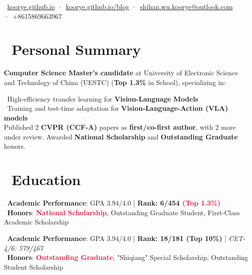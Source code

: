 \documentclass{resume}
\begin{document}

\vspace{-4pt}

\vspace{-4pt}

\vspace{-4pt}
\centerline{\sffamily\large{
\faHome\ \href{https://koorye.github.io}{koorye.github.io}
·\faLink\ \href{https://koorye.github.io/blog}{koorye.github.io/blog}
·\faEnvelope\ \href{mailto:shihan.wu.koorye@outlook.com}{shihan.wu.koorye@outlook.com}
·\faPhone\ +8615869663967
}}

\vspace{-2pt}
\section{\faUser\ Personal Summary}

\textbf{Computer Science Master's candidate} at University of Electronic Science and Technology of China (UESTC) 
(\textbf{Top 1.3\%} in School), specializing in:

\faAngleRight\ High-efficiency transfer learning for \textbf{Vision-Language Models} \\
\faAngleRight\ Training and test-time adaptation for \textbf{Vision-Language-Action (VLA) models} \\
Published 2 \textbf{CVPR (CCF-A)} papers as \textbf{first/co-first author}, with 2 more under review. 
Awarded \textbf{National Scholarship} and \textbf{Outstanding Graduate} honors.

\section*{\faGraduationCap\ Education}

\faAngleRight\ \textbf{Academic Performance}: GPA 3.94/4.0 \quad | \quad \textbf{Rank: 6/454 \textcolor{crimson}{(Top 1.3\%)}} \\
\faAngleRight\ \textbf{Honors}: \textcolor{crimson}{\textbf{National Scholarship}}, Outstanding Graduate Student, First-Class Academic Scholarship

\vspace{5pt}
\faAngleRight\ \textbf{Academic Performance}: GPA 3.94/4.0 \quad | \quad \textbf{Rank: 18/181 (Top 10\%)} \quad | \quad \textit{CET-4/6: 579/467} \\
\faAngleRight\ \textbf{Honors}: \textcolor{crimson}{\textbf{Outstanding Graduate}}, "Shiqiang" Special Scholarship, Outstanding Student Scholarship
\end{document}
